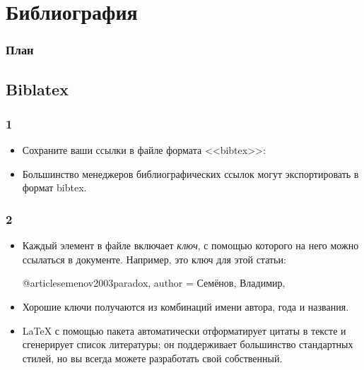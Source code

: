 \documentclass{beamer}
\begin{document}
\section{Библиография}

\begin{frame}
\frametitle{План}
\vspace{-3ex}
\begin{multicols}{2}
\tableofcontents[currentsection]
\end{multicols}
\end{frame}

\subsection{Biblatex}

\begin{frame}[fragile]
\frametitle{\insertsubsection{} 1}
\vspace{-2ex}
\begin{itemize}
\item Сохраните ваши ссылки в  файле формата <<bibtex>>:
\item Большинство менеджеров библиографических ссылок могут экспортировать в
  формат bibtex.
\end{itemize}
\end{frame}

\begin{frame}[fragile]
\frametitle{\insertsubsection{} 2}
\begin{itemize}
\item Каждый элемент в  файле включает \emph{ключ}, с помощью которого
на него можно ссылаться в документе. Например,  это
ключ для этой статьи:
\begin{bibtexcode}
@article{semenov2003paradox,
  author = {Семёнов, Владимир},
}
\end{bibtexcode}
\item Хорошие ключи получаются из комбинаций имени автора, года и названия.
\item \LaTeX{} с помощью пакета  автоматически отформатирует
цитаты в тексте и сгенерирует список литературы; он поддерживает большинство
стандартных стилей, но вы всегда можете разработать свой собственный.
\end{itemize}
\end{frame}
\end{document}
